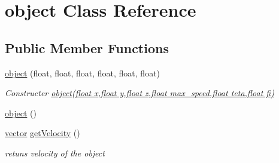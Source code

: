 \hypertarget{classobject}{\section{object \-Class \-Reference}
\label{classobject}
}
\subsection*{\-Public \-Member \-Functions}
\begin{DoxyCompactItemize}
\item 
\hyperlink{classobject_aa9c6efb8a4e2ede1f55c1278d2777ebf}{object} (float, float, float, float, float, float)
\begin{DoxyCompactList}\small\item\em \-Constructer \hyperlink{classobject_aa9c6efb8a4e2ede1f55c1278d2777ebf}{object(float x,float y,float z,float max\-\_\-speed,float teta,float fi)} \end{DoxyCompactList}\item 
\hyperlink{classobject_a04aad740887b47c735b9ed9078e45d77}{object} ()
\item 
\hypertarget{classobject_ab37f04add68056889e6f820c3e2e3cff}{\hyperlink{classvector}{vector} \hyperlink{classobject_ab37f04add68056889e6f820c3e2e3cff}{get\-Velocity} ()}\label{classobject_ab37f04add68056889e6f820c3e2e3cff}

\begin{DoxyCompactList}\small\item\em retuns velocity of the object \end{DoxyCompactList}\end{DoxyCompactItemize}
